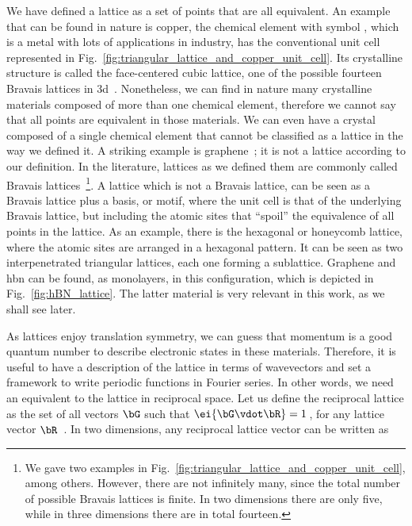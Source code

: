 We have defined a lattice as a set of points that are all equivalent.
An example that can be found in nature is copper, the chemical element with symbol , which is a metal with lots of applications in industry, has the conventional unit cell represented in Fig.~\ref{fig:triangular_lattice_and_copper_unit_cell}.
Its crystalline structure is called the face-centered cubic lattice, one of the possible fourteen Bravais lattices in \gls{3d}~\cite{Kittel_2004}.
Nonetheless, we can find in nature many crystalline materials composed of more than one chemical element, therefore we cannot say that all points are equivalent in those materials.
We can even have a crystal composed of a single chemical element that cannot be classified as a lattice in the way we defined it.
A striking example is graphene~\cite{Novoselov_Geim_2004}; it is not a lattice according to our definition.
In the literature, lattices as we defined them are commonly called Bravais lattices~\footnote{We gave two examples in Fig.~\ref{fig:triangular_lattice_and_copper_unit_cell}, among others. However, there are not infinitely many, since the total number of possible Bravais lattices is finite. In two dimensions there are only five, while in three dimensions there are in total fourteen.}.
A lattice which is not a Bravais lattice, can be seen as a Bravais lattice plus a basis, or motif, where the unit cell is that of the underlying Bravais lattice, but including the atomic sites that ``spoil'' the equivalence of all points in the lattice.
As an example, there is the hexagonal or honeycomb lattice, where the atomic sites are arranged in a hexagonal pattern.
It can be seen as two interpenetrated triangular lattices, each one forming a sublattice.
Graphene and \gls{hbn} can be found, as monolayers, in this configuration, which is depicted in Fig.~\ref{fig:hBN_lattice}.
The latter material is very relevant in this work, as we shall see later.

As lattices enjoy translation symmetry, we can guess that momentum is a good quantum number to describe electronic states in these materials.
Therefore, it is useful to have a description of the lattice in terms of wavevectors and set a framework to write periodic functions in Fourier series.
In other words, we need an equivalent to the lattice in reciprocal space.
Let us define the reciprocal lattice as the set of all vectors $\bG$ such that $\ei{\bG \vdot \bR} = 1$\,, for any lattice vector $\bR$~\cite{Simon_Oxford_2013,Kittel_2004,Ashcroft_Mermin,Bruus_Flensberg_2004}.
In two dimensions, any reciprocal lattice vector can be written as

